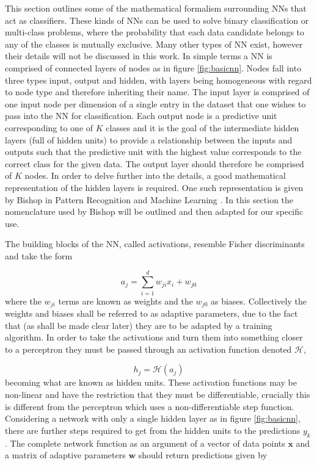 This section outlines some of the mathematical formalism surrounding NNs
that act as classifiers. These kinds of NNs can be used to solve binary
classification or multi-class problems, where the probability that each data
candidate belongs to any of the classes is mutually exclusive. Many other types
of NN exist, however their details will not be discussed in this work. In simple
terms a NN is comprised of connected layers of nodes as in figure
\ref{fig:basicnn}. Nodes fall into three types input, output and hidden, with
layers being homogeneous with regard to node type and therefore inheriting their
name. The input layer is comprised of one input node per dimension of a single
entry in the dataset that one wishes to pass into the NN for classification.
Each output node is a predictive unit corresponding to one of $K$ classes and it
is the goal of the intermediate hidden layers (full of hidden units) to provide
a relationship between the inputs and outputs such that the predictive unit with
the highest value corresponds to the correct class for the given data. The
output layer should therefore be comprised of $K$ nodes. In order to delve
further into the details, a good mathematical representation of the hidden
layers is required. One such representation is given by Bishop in Pattern
Recognition and Machine Learning \cite{PRML}. In this section the nomenclature
used by Bishop will be outlined and then adapted for our specific use.


The building blocks of the NN, called activations, resemble Fisher
discriminants \cite{Fisher} and take the form

\begin{equation}
a_j = \sum_{i=1}^{d} w_{ji}x_{i} + w_{j0}
\label{eq:fisher}
\end{equation}
where the $w_{ji}$ terms are known as weights and the $w_{j0}$ as biases.
Collectively the weights and biases shall be referred to as adaptive parameters,
due to the fact that (as shall be made clear later) they are to be adapted by a
training algorithm. In order to take the activations and turn them into
something closer to a perceptron \cite{Rosenblatt} they must be passed through
an activation function denoted $\mathcal{H}$,

\begin{equation}
h_j = \mathcal{H}(a_j)
\label{eq:hiddenunit}
\end{equation}
becoming what are known as hidden units. These activation functions may be
non-linear and have the restriction that they must be differentiable, crucially
this is different from the perceptron which uses a non-differentiable step
function. Considering a network with only a single hidden layer as in figure
\ref{fig:basicnn}, there are further steps required to get from the hidden units
to the predictions $y_k$. The complete network function as an argument of a
vector of data points $\boldsymbol{x}$ and a matrix of adaptive parameters
$\boldsymbol{w}$ should return predictions given by

